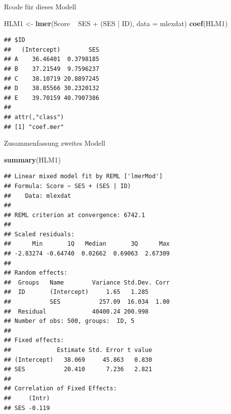 \documentclass[ignorenonframetext,]{beamer}
\newenvironment{Shaded}{}{}
\newcommand{\KeywordTok}[1]{\textcolor[rgb]{0.00,0.44,0.13}{\textbf{{#1}}}}
\newcommand{\DataTypeTok}[1]{\textcolor[rgb]{0.56,0.13,0.00}{{#1}}}
\newcommand{\StringTok}[1]{\textcolor[rgb]{0.25,0.44,0.63}{{#1}}}
\newcommand{\NormalTok}[1]{{#1}}
\begin{document}
\begin{frame}[fragile]{Rcode für dieses Modell}

\begin{Shaded}
\begin{Highlighting}[]
\NormalTok{HLM1 <-}\StringTok{ }\KeywordTok{lmer}\NormalTok{(Score ~}\StringTok{ }\NormalTok{SES +}\StringTok{ }\NormalTok{(SES |}\StringTok{ }\NormalTok{ID), }\DataTypeTok{data =} \NormalTok{mlexdat)}
\KeywordTok{coef}\NormalTok{(HLM1)}
\end{Highlighting}
\end{Shaded}

\begin{verbatim}
## $ID
##   (Intercept)        SES
## A    36.46401  0.3798185
## B    37.21549  9.7596237
## C    38.10719 20.8897245
## D    38.85566 30.2320132
## E    39.70159 40.7907386
## 
## attr(,"class")
## [1] "coef.mer"
\end{verbatim}

\end{frame}

\begin{frame}[fragile]{Zusammenfassung zweites Modell}

\begin{Shaded}
\begin{Highlighting}[]
\KeywordTok{summary}\NormalTok{(HLM1)}
\end{Highlighting}
\end{Shaded}

\begin{verbatim}
## Linear mixed model fit by REML ['lmerMod']
## Formula: Score ~ SES + (SES | ID)
##    Data: mlexdat
## 
## REML criterion at convergence: 6742.1
## 
## Scaled residuals: 
##      Min       1Q   Median       3Q      Max 
## -2.83274 -0.64740  0.02662  0.69063  2.67309 
## 
## Random effects:
##  Groups   Name        Variance Std.Dev. Corr
##  ID       (Intercept)     1.65   1.285      
##           SES           257.09  16.034  1.00
##  Residual             40400.24 200.998      
## Number of obs: 500, groups:  ID, 5
## 
## Fixed effects:
##             Estimate Std. Error t value
## (Intercept)   38.069     45.863   0.830
## SES           20.410      7.236   2.821
## 
## Correlation of Fixed Effects:
##     (Intr)
## SES -0.119
\end{verbatim}

\end{frame}
\end{document}

